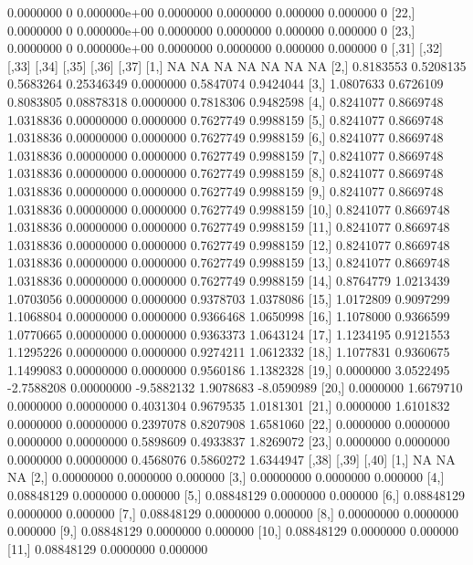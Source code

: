 \documentclass[a4paper]{article}
\begin{document}
\begin{Schunk}
\begin{Soutput}
[21,] 0.0000000     0 0.000000e+00 0.0000000 0.0000000 0.000000  0.000000     0
[22,] 0.0000000     0 0.000000e+00 0.0000000 0.0000000 0.000000  0.000000     0
[23,] 0.0000000     0 0.000000e+00 0.0000000 0.0000000 0.000000  0.000000     0
          [,31]     [,32]      [,33]      [,34]      [,35]     [,36]      [,37]
 [1,]        NA        NA         NA         NA         NA        NA         NA
 [2,] 0.8183553 0.5208135  0.5683264 0.25346349  0.0000000 0.5847074  0.9424044
 [3,] 1.0807633 0.6726109  0.8083805 0.08878318  0.0000000 0.7818306  0.9482598
 [4,] 0.8241077 0.8669748  1.0318836 0.00000000  0.0000000 0.7627749  0.9988159
 [5,] 0.8241077 0.8669748  1.0318836 0.00000000  0.0000000 0.7627749  0.9988159
 [6,] 0.8241077 0.8669748  1.0318836 0.00000000  0.0000000 0.7627749  0.9988159
 [7,] 0.8241077 0.8669748  1.0318836 0.00000000  0.0000000 0.7627749  0.9988159
 [8,] 0.8241077 0.8669748  1.0318836 0.00000000  0.0000000 0.7627749  0.9988159
 [9,] 0.8241077 0.8669748  1.0318836 0.00000000  0.0000000 0.7627749  0.9988159
[10,] 0.8241077 0.8669748  1.0318836 0.00000000  0.0000000 0.7627749  0.9988159
[11,] 0.8241077 0.8669748  1.0318836 0.00000000  0.0000000 0.7627749  0.9988159
[12,] 0.8241077 0.8669748  1.0318836 0.00000000  0.0000000 0.7627749  0.9988159
[13,] 0.8241077 0.8669748  1.0318836 0.00000000  0.0000000 0.7627749  0.9988159
[14,] 0.8764779 1.0213439  1.0703056 0.00000000  0.0000000 0.9378703  1.0378086
[15,] 1.0172809 0.9097299  1.1068804 0.00000000  0.0000000 0.9366468  1.0650998
[16,] 1.1078000 0.9366599  1.0770665 0.00000000  0.0000000 0.9363373  1.0643124
[17,] 1.1234195 0.9121553  1.1295226 0.00000000  0.0000000 0.9274211  1.0612332
[18,] 1.1077831 0.9360675  1.1499083 0.00000000  0.0000000 0.9560186  1.1382328
[19,] 0.0000000 3.0522495 -2.7588208 0.00000000 -9.5882132 1.9078683 -8.0590989
[20,] 0.0000000 1.6679710  0.0000000 0.00000000  0.4031304 0.9679535  1.0181301
[21,] 0.0000000 1.6101832  0.0000000 0.00000000  0.2397078 0.8207908  1.6581060
[22,] 0.0000000 0.0000000  0.0000000 0.00000000  0.5898609 0.4933837  1.8269072
[23,] 0.0000000 0.0000000  0.0000000 0.00000000  0.4568076 0.5860272  1.6344947
            [,38]      [,39]    [,40]
 [1,]          NA         NA       NA
 [2,]  0.00000000  0.0000000 0.000000
 [3,]  0.00000000  0.0000000 0.000000
 [4,]  0.08848129  0.0000000 0.000000
 [5,]  0.08848129  0.0000000 0.000000
 [6,]  0.08848129  0.0000000 0.000000
 [7,]  0.08848129  0.0000000 0.000000
 [8,]  0.00000000  0.0000000 0.000000
 [9,]  0.08848129  0.0000000 0.000000
[10,]  0.08848129  0.0000000 0.000000
[11,]  0.08848129  0.0000000 0.000000

\end{Soutput}
\end{Schunk}
\end{document}
